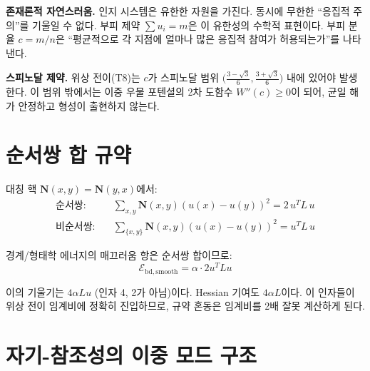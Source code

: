 \textbf{존재론적 자연스러움.} 인지 시스템은 유한한 자원을 가진다. 동시에 무한한 ``응집적 주의''를 기울일 수 없다. 부피 제약 $\sum u_i = m$은 이 유한성의 수학적 표현이다. 부피 분율 $c = m/n$은 ``평균적으로 각 지점에 얼마나 많은 응집적 참여가 허용되는가''를 나타낸다.

\textbf{스피노달 제약.} 위상 전이(T8)는 $c$가 스피노달 범위 $\big(\frac{3-\sqrt{3}}{6}, \frac{3+\sqrt{3}}{6}\big)$ 내에 있어야 발생한다. 이 범위 밖에서는 이중 우물 포텐셜의 2차 도함수 $W''(c) \geq 0$이 되어, 균일 해가 안정하고 형성이 출현하지 않는다.


\section{순서쌍 합 규약}
\label{app:cn-summation}

\begin{center}
\end{center}

대칭 핵 $\mathbf{N}(x,y) = \mathbf{N}(y,x)$에서:
\begin{align}
    \text{순서쌍:}\quad &\sum_{x,y} \mathbf{N}(x,y)(u(x) - u(y))^2 = 2\, u^T L\, u \\
    \text{비순서쌍:}\quad &\sum_{\{x,y\}} \mathbf{N}(x,y)(u(x) - u(y))^2 = u^T L\, u
\end{align}

경계/형태학 에너지의 매끄러움 항은 순서쌍 합이므로:
\begin{equation}
    \mathcal{E}_{\mathrm{bd,smooth}} = \alpha \cdot 2u^T L u
\end{equation}

이의 기울기는 $4\alpha L u$ (인자 4, 2가 아님)이다. Hessian 기여도 $4\alpha L$이다. 이 인자들이 위상 전이 임계비에 정확히 진입하므로, 규약 혼동은 임계비를 2배 잘못 계산하게 된다.


\section{자기-참조성의 이중 모드 구조}
\label{app:cn-self-referential}

\begin{center}
\end{center}

